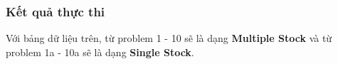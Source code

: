 \documentclass[a4paper]{article}
\begin{document}
\clearpage
\subsubsection{Kết quả thực thi}
\indent Với bảng dữ liệu trên, từ problem 1 - 10 sẽ là dạng \textbf{Multiple Stock} và từ problem 1a - 10a sẽ là dạng \textbf{Single Stock}.
\end{document}

